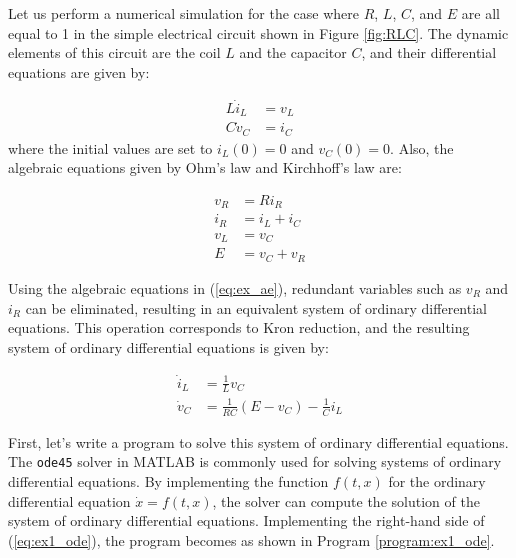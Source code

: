 \documentclass[graybox, envcountchap]{svmult}
\begin{document}
\begin{example}\label{ex:dae_ex1}

Let us perform a numerical simulation for the case where $R$, $L$, $C$, and $E$
are all equal to 1 in the simple electrical circuit shown in Figure
\ref{fig:RLC}. The dynamic elements of this circuit are the coil $L$ and the
capacitor $C$, and their differential equations are given by:

\begin{subequations}\label{eq:ex_de}
  \begin{align}
    L\dot i_L & = v_L \\
    C\dot v_C & = i_C
  \end{align}
\end{subequations}
where the initial values are set to $i_L(0)=0$ and $v_C(0)=0$. Also, the
algebraic equations given by Ohm's law and Kirchhoff's law are:

\begin{subequations}\label{eq:ex_ae}
  \begin{align}
    v_R & = R i_R      \\
    i_R & = i_L + i_C \\
    v_L & = v_C       \\
    E   & = v_C + v_R
  \end{align}
\end{subequations}

Using the algebraic equations in (\ref{eq:ex_ae}), redundant variables such as
$v_R$ and $i_R$ can be eliminated, resulting in an equivalent system of ordinary
differential equations. This operation corresponds to Kron reduction, and the
resulting system of ordinary differential equations is given by:

\begin{subequations}\label{eq:ex1_ode}
  \begin{align}
    \dot{i}_L & = \frac{1}{L}v_C                     \\
    \dot{v}_C & = \frac{1}{RC}(E-v_C)-\frac{1}{C}i_L
  \end{align}
\end{subequations}

First, let's write a program to solve this system of ordinary differential
equations. The \verb|ode45| solver in MATLAB is commonly used for solving
systems of ordinary differential equations. By implementing the function
$f(t,x)$ for the ordinary differential equation $\dot{x} = f(t,x)$, the solver
can compute the solution of the system of ordinary differential equations.
Implementing the right-hand side of (\ref{eq:ex1_ode}), the program becomes as
shown in Program \ref{program:ex1_ode}.



\end{example}
\end{document}
